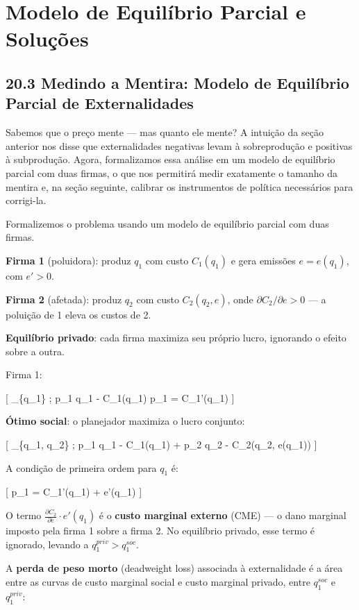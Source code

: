 \documentclass[11pt,twoside,openright]{book}
\begin{document}
\chapter{Modelo de Equilíbrio Parcial e
Soluções}\label{modelo-de-equiluxedbrio-parcial-e-soluuxe7uxf5es}

\section{20.3 Medindo a Mentira: Modelo de Equilíbrio Parcial de
Externalidades}\label{203}

Sabemos que o preço mente --- mas quanto ele mente? A intuição da seção
anterior nos disse que externalidades negativas levam à sobreprodução e
positivas à subprodução. Agora, formalizamos essa análise em um modelo
de equilíbrio parcial com duas firmas, o que nos permitirá medir
exatamente o tamanho da mentira e, na seção seguinte, calibrar os
instrumentos de política necessários para corrigi-la.

Formalizemos o problema usando um modelo de equilíbrio parcial com duas
firmas.

\textbf{Firma 1} (poluidora): produz \(q_1\) com custo \(C_1(q_1)\) e
gera emissões \(e = e(q_1)\), com \(e' > 0\).

\textbf{Firma 2} (afetada): produz \(q_2\) com custo \(C_2(q_2, e)\),
onde \(\partial C_2 / \partial e > 0\) --- a poluição de 1 eleva os
custos de 2.

\textbf{Equilíbrio privado}: cada firma maximiza seu próprio lucro,
ignorando o efeito sobre a outra.

Firma 1:

{[} \max\_\{q\_1\} ; p\_1 q\_1 - C\_1(q\_1) \implies p\_1 = C\_1'(q\_1)
{]}

\textbf{Ótimo social}: o planejador maximiza o lucro conjunto:

{[} \max\_\{q\_1, q\_2\} ; p\_1 q\_1 - C\_1(q\_1) + p\_2 q\_2 -
C\_2(q\_2, e(q\_1)) {]}

A condição de primeira ordem para \(q_1\) é:

{[} p\_1 = C\_1'(q\_1) +  \cdot e'(q\_1)
\label{eq:20.7}  {]}

O termo \(\frac{\partial C_2}{\partial e} \cdot e'(q_1)\) é o
\textbf{custo marginal externo} (CME) --- o dano marginal imposto pela
firma 1 sobre a firma 2. No equilíbrio privado, esse termo é ignorado,
levando a \(q_1^{priv} > q_1^{soc}\).

A \textbf{perda de peso morto} (deadweight loss) associada à
externalidade é a área entre as curvas de custo marginal social e custo
marginal privado, entre \(q_1^{soc}\) e \(q_1^{priv}\):
\end{document}
